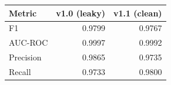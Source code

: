 \begin{tabular}{lrr}
\toprule
Metric & v1.0 (leaky) & v1.1 (clean) \\
\midrule
F1 & 0.9799 & 0.9767 \\
AUC-ROC & 0.9997 & 0.9992 \\
Precision & 0.9865 & 0.9735 \\
Recall & 0.9733 & 0.9800 \\
\bottomrule
\end{tabular}
